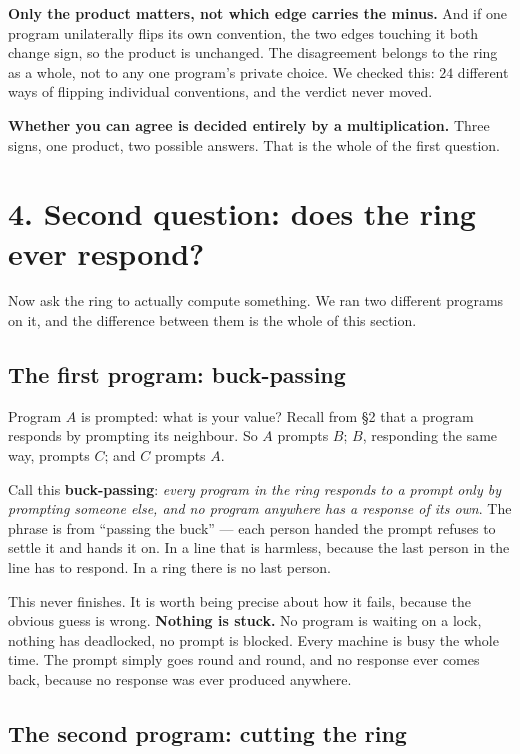 \documentclass[11pt,a4paper]{article}
\begin{document}
\textbf{Only the product matters, not which edge carries the minus.} And if one
program unilaterally flips its own convention, the two edges touching it both
change sign, so the product is unchanged. The disagreement belongs to the ring
as a whole, not to any one program's private choice. We checked this: $24$
different ways of flipping individual conventions, and the verdict never moved.

\textbf{Whether you can agree is decided entirely by a multiplication.} Three
signs, one product, two possible answers. That is the whole of the first
question.

\section*{4. Second question: does the ring ever respond?}

Now ask the ring to actually compute something. We ran two different programs
on it, and the difference between them is the whole of this section.

\subsection*{The first program: buck-passing}

Program $A$ is prompted: what is your value? Recall from \S2 that a program
responds by prompting its neighbour. So $A$ prompts $B$; $B$, responding the
same way, prompts $C$; and $C$ prompts $A$.

Call this \textbf{buck-passing}: \emph{every program in the ring responds to a
prompt only by prompting someone else, and no program anywhere has a response
of its own}. The phrase is from ``passing the buck'' --- each person handed the
prompt refuses to settle it and hands it on. In a line that is harmless,
because the last person in the line has to respond. In a ring there is no last
person.

This never finishes. It is worth being precise about how it fails, because the
obvious guess is wrong. \textbf{Nothing is stuck.} No program is waiting on a
lock, nothing has deadlocked, no prompt is blocked. Every machine is busy the
whole time. The prompt simply goes round and round, and no response ever comes
back, because no response was ever produced anywhere.

\subsection*{The second program: cutting the ring}
\end{document}
